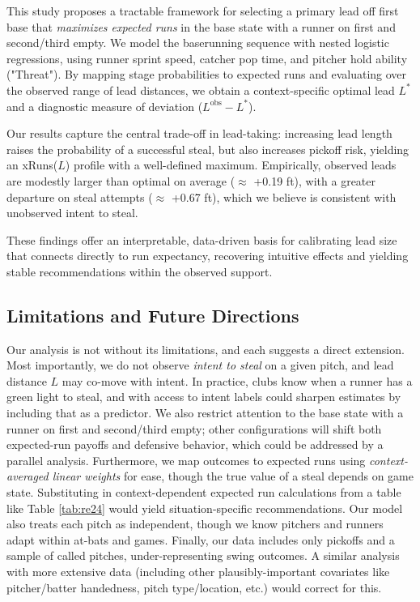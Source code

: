 \documentclass[12pt,letterpaper]{article}
\begin{document}
This study proposes a tractable framework for selecting a primary lead off first base that \emph{maximizes expected runs} in the base state with a runner on first and second/third empty. We model the baserunning sequence with nested logistic regressions, using runner sprint speed, catcher pop time, and pitcher hold ability ("Threat"). By mapping stage probabilities to expected runs and evaluating over the observed range of lead distances, we obtain a context-specific optimal lead $L^*$ and a diagnostic measure of deviation ($L^\text{obs}-L^*$).

Our results capture the central trade-off in lead-taking: increasing lead length raises the probability of a successful steal, but also increases pickoff risk, yielding an xRuns($L$) profile with a well-defined maximum. Empirically, observed leads are modestly larger than optimal on average ($\approx$ +0.19 ft), with a greater departure on steal attempts ($\approx$ +0.67 ft), which we believe is consistent with unobserved intent to steal.

These findings offer an interpretable, data-driven basis for calibrating lead size that connects directly to run expectancy, recovering intuitive effects and yielding stable recommendations within the observed support.

\subsection{Limitations and Future Directions}

Our analysis is not without its limitations, and each suggests a direct extension. Most importantly, we do not observe \emph{intent to steal} on a given pitch, and lead distance $L$ may co-move with intent. In practice, clubs know when a runner has a green light to steal, and with access to intent labels could sharpen estimates by including that as a predictor. We also restrict attention to the base state with a runner on first and second/third empty; other configurations will shift both expected-run payoffs and defensive behavior, which could be addressed by a parallel analysis. Furthermore, we map outcomes to expected runs using \emph{context-averaged linear weights} for ease, though the true value of a steal depends on game state. Substituting in context-dependent expected run calculations from a table like Table \ref{tab:re24} would yield situation-specific recommendations. Our model also treats each pitch as independent, though we know pitchers and runners adapt within at-bats and games. Finally, our data includes only pickoffs and a sample of called pitches, under-representing swing outcomes. A similar analysis with more extensive data (including other plausibly-important covariates like pitcher/batter handedness, pitch type/location, etc.) would correct for this.
\end{document}
